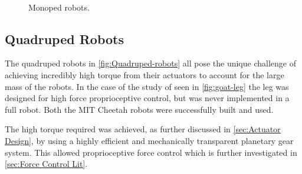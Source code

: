 \begin{figure}
\centering
{}
~
\caption{Monoped robots.}
\label{monoped-robots}
\end{figure}


\subsection{Quadruped Robots}

The quadruped robots in \cref{fig:Quadruped-robots} all pose the unique challenge of achieving incredibly high torque from their actuators to account for the large mass of the robots. In the case of the study of \cite{Kalouche2016} seen in \cref{fig:goat-leg} the leg was designed for high force proprioceptive control, but was never implemented in a full robot. Both the MIT Cheetah robots were successfully built and used. 

The high torque required was achieved, as further discussed in \cref{sec:Actuator Design}, by using a highly efficient and mechanically transparent planetary gear system. This allowed proprioceptive force control which is further investigated in \cref{sec:Force Control Lit}. 


